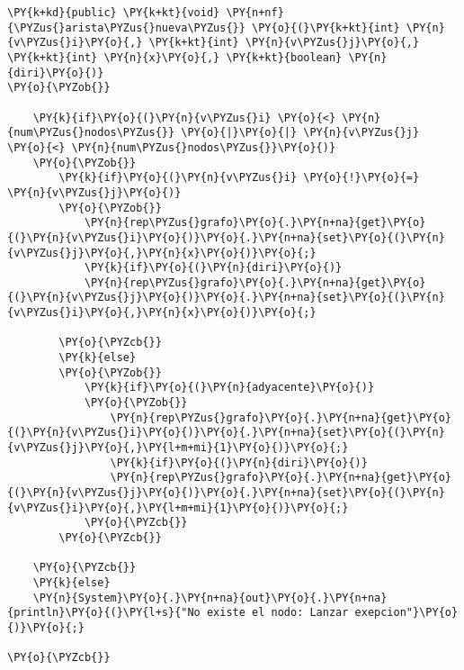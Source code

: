 \begin{Verbatim}[commandchars=\\\{\}]
\PY{k+kd}{public} \PY{k+kt}{void} \PY{n+nf}{\PYZus{}arista\PYZus{}nueva\PYZus{}} \PY{o}{(}\PY{k+kt}{int} \PY{n}{v\PYZus{}i}\PY{o}{,} \PY{k+kt}{int} \PY{n}{v\PYZus{}j}\PY{o}{,} \PY{k+kt}{int} \PY{n}{x}\PY{o}{,} \PY{k+kt}{boolean} \PY{n}{diri}\PY{o}{)}
\PY{o}{\PYZob{}}

    \PY{k}{if}\PY{o}{(}\PY{n}{v\PYZus{}i} \PY{o}{<} \PY{n}{num\PYZus{}nodos\PYZus{}} \PY{o}{|}\PY{o}{|} \PY{n}{v\PYZus{}j} \PY{o}{<} \PY{n}{num\PYZus{}nodos\PYZus{}}\PY{o}{)}
	\PY{o}{\PYZob{}}
	    \PY{k}{if}\PY{o}{(}\PY{n}{v\PYZus{}i} \PY{o}{!}\PY{o}{=} \PY{n}{v\PYZus{}j}\PY{o}{)}
		\PY{o}{\PYZob{}}
		    \PY{n}{rep\PYZus{}grafo}\PY{o}{.}\PY{n+na}{get}\PY{o}{(}\PY{n}{v\PYZus{}i}\PY{o}{)}\PY{o}{.}\PY{n+na}{set}\PY{o}{(}\PY{n}{v\PYZus{}j}\PY{o}{,}\PY{n}{x}\PY{o}{)}\PY{o}{;}
		    \PY{k}{if}\PY{o}{(}\PY{n}{diri}\PY{o}{)}
			\PY{n}{rep\PYZus{}grafo}\PY{o}{.}\PY{n+na}{get}\PY{o}{(}\PY{n}{v\PYZus{}j}\PY{o}{)}\PY{o}{.}\PY{n+na}{set}\PY{o}{(}\PY{n}{v\PYZus{}i}\PY{o}{,}\PY{n}{x}\PY{o}{)}\PY{o}{;}
			
		\PY{o}{\PYZcb{}}
	    \PY{k}{else}
		\PY{o}{\PYZob{}}
		    \PY{k}{if}\PY{o}{(}\PY{n}{adyacente}\PY{o}{)}
			\PY{o}{\PYZob{}}
			    \PY{n}{rep\PYZus{}grafo}\PY{o}{.}\PY{n+na}{get}\PY{o}{(}\PY{n}{v\PYZus{}i}\PY{o}{)}\PY{o}{.}\PY{n+na}{set}\PY{o}{(}\PY{n}{v\PYZus{}j}\PY{o}{,}\PY{l+m+mi}{1}\PY{o}{)}\PY{o}{;}
			    \PY{k}{if}\PY{o}{(}\PY{n}{diri}\PY{o}{)}
				\PY{n}{rep\PYZus{}grafo}\PY{o}{.}\PY{n+na}{get}\PY{o}{(}\PY{n}{v\PYZus{}j}\PY{o}{)}\PY{o}{.}\PY{n+na}{set}\PY{o}{(}\PY{n}{v\PYZus{}i}\PY{o}{,}\PY{l+m+mi}{1}\PY{o}{)}\PY{o}{;}
			\PY{o}{\PYZcb{}}
		\PY{o}{\PYZcb{}}
		    
	\PY{o}{\PYZcb{}}
    \PY{k}{else}
	\PY{n}{System}\PY{o}{.}\PY{n+na}{out}\PY{o}{.}\PY{n+na}{println}\PY{o}{(}\PY{l+s}{"No existe el nodo: Lanzar exepcion"}\PY{o}{)}\PY{o}{;}
       
\PY{o}{\PYZcb{}}
\end{Verbatim}
